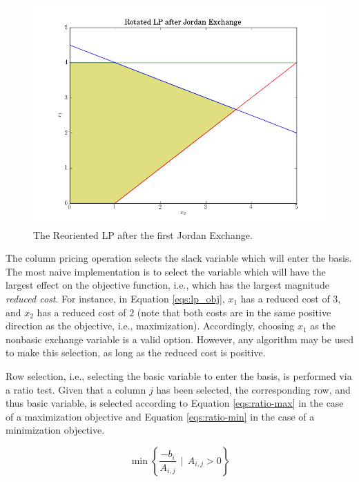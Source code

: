 \begin{figure}[H]
  \begin{center}
    \includegraphics[width=\linewidth]{./chapters/litreview/plots/rotated.png}
  \caption{The Reoriented LP after the first Jordan Exchange.}
  \label{fig:rotated}
  \end{center}
\end{figure}

The column pricing operation selects the slack variable which will enter the
basis. The most naive implementation is to select the variable which will have
the largest effect on the objective function, i.e., which has the largest
magnitude \textit{reduced cost}. For instance, in Equation \ref{eqs:lp_obj},
$x_1$ has a reduced cost of 3, and $x_2$ has a reduced cost of 2 (note that both
costs are in the same positive direction as the objective, i.e.,
maximization). Accordingly, choosing $x_1$ as the nonbasic exchange variable is
a valid option. However, any algorithm may be used to make this selection, as
long as the reduced cost is positive.

Row selection, i.e., selecting the basic variable to enter the basis, is
performed via a ratio test. Given that a column $j$ has been selected, the
corresponding row, and thus basic variable, is selected according to
Equation \ref{eqs:ratio-max} in the case of a maximization objective and
Equation \ref{eqs:ratio-min} in the case of a minimization objective.

\begin{equation}\label{eqs:ratio-max}
  \min \left\{ \frac{-b_i}{A_{i,j}} \:\: | \:\: A_{i,j} > 0 \right\}
\end{equation}

